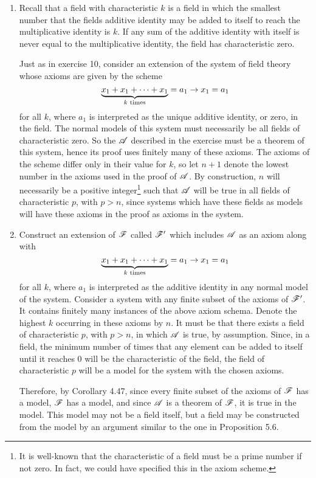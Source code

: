 \begin{enumerate}
  \item %
    Recall that a field with characteristic \(k\) is a field in which the smallest number that the fields additive identity may be added to itself to reach the multiplicative identity is \(k\). If any sum of the additive identity with itself is never equal to the multiplicative identity, the field has characteristic zero.

    Just as in exercise 10, consider an extension of the system of field theory whose axioms are given by the scheme
    \[\underbrace{x_1 + x_1 + \dots + x_1}_{k \text{ times}} = a_1 \rightarrow x_1 = a_1\]
    for all \(k\), where \(a_1\) is interpreted as the unique additive identity, or zero, in the field. The normal models of this system must necessarily be all fields of characteristic zero. So the \wf{} \(\mathscr{A}\) described in the exercise must be a theorem of this system, hence its proof uses finitely many of these axioms. The axioms of the scheme differ only in their value for \(k\), so let \(n + 1\) denote the lowest number in the axioms used in the proof of \(\mathscr{A}\). By construction, \(n\) will necessarily be a positive integer\footnote{It is well-known that the characteristic of a field must be a prime number if not zero. In fact, we could have specified this in the axiom scheme.} such that \(\mathscr{A}\) will be true in all fields of characteristic \(p\), with \(p > n\), since systems which have these fields as models will have these axioms in the proof as axioms in the system.

  \item %
    Construct an extension of \(\mathscr{F}\) called \(\mathscr{F}'\) which includes \(\mathscr{A}\) as an axiom along with
    \[\underbrace{x_1 + x_1 + \dots + x_1}_{k \text{ times}} = a_1 \rightarrow x_1 = a_1\]
    for all \(k\), where \(a_1\) is interpreted as the additive identity in any normal model of the system. Consider a system with any finite subset of the axioms of \(\mathscr{F}'\). It contains finitely many instances of the above axiom schema. Denote the highest \(k\) occurring in these axioms by \(n\). It must be that there exists a field of characteristic \(p\), with \(p>n\), in which \(\mathscr{A}\) is true, by assumption. Since, in a field, the minimum number of times that any element can be added to itself until it reaches \(0\) will be the characteristic of the field, the field of characteristic \(p\) will be a model for the system with the chosen axioms. 

    Therefore, by Corollary 4.47, since every finite subset of the axioms of \(\mathscr{F}\) has a model, \(\mathscr{F}\) has a model, and since \(\mathscr{A}\) is a theorem of \(\mathscr{F}\), it is true in the model. This model may not be a field itself, but a field may be constructed from the model by an argument similar to the one in Proposition 5.6.
\end{enumerate}
